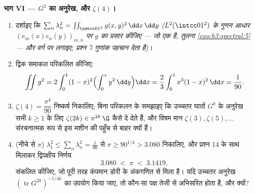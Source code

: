 \begin{problem}[{सप्ताहांत समस्या --- ग्रीन संकारक, ज्या आधार,
और एक अनुरेख सूत्र}]
\medskip
\noindent\textbf{भाग VI --- $G^2$ का अनुरेख, और $\zeta(4)$।}
\begin{enumerate}[resume]
  \item दर्शाइए कि $\sum_n\lambda_n^2 =
        \iint_{\intcc01^2}g(x,y)^2\,\dd x\,\dd y$ \emph{($L^2(\intcc01^2)$ के गुणन आधार $(e_m(x)e_n(y))_{m,n}$ पर $g$
        का प्रसार कीजिए --- जो एक  है, तुलना \cref{exo:b3:spectral:5}
        --- और वर्ग पर  लगाइए; प्रश्न 7 गुणांक पहचान देता
        है)}।
  \item द्विक समाकल परिकलित कीजिए:
        \[
        \iint g^2 = 2\int_0^1(1-x)^2\Bigl(\int_0^x
        y^2\,\dd y\Bigr)\dd x
        = \frac23\int_0^1x^3(1-x)^2\,\dd x = \frac1{90} .
        \]
  \item $\zeta(4) = \dfrac{\pi^4}{90}$ निष्कर्ष निकालिए; बिना परिकलन के समझाइए कि उच्चतर
        घातों $G^k$ के अनुरेख सभी $k \geq 1$ के लिए $\zeta(2k) \in \pi^{2k}\,\Q$ कैसे दे देते
        हैं, और विषम मान $\zeta(3),
        \zeta(5), \dots$ संरचनात्मक रूप से इस मशीन की पहुँच
        से बाहर क्यों हैं।
  \item (नीचे से $\pi$) $\lambda_1^2 \leq
        \sum_n\lambda_n^2 = \frac1{90}$ से $\pi \geq
        90^{1/4} > 3.080$ निकालिए, और प्रश्न 14 के
        साथ मिलाकर द्विपक्षीय निर्णय
        \[
        3.080 \;<\; \pi \;<\; 3.1419,
        \]
        संकलित कीजिए, जो पूरी तरह कंपमान डोरी के अंकगणित से मिला
        है। यदि उच्चतर अनुरेख $(\operatorname{tr}G^{2k})^{-1/4k}$ का उपयोग किया जाए, तो कौन-सा
        पक्ष तेजी से अभिसरित होता है, और क्यों?
\end{enumerate}


\end{problem}
